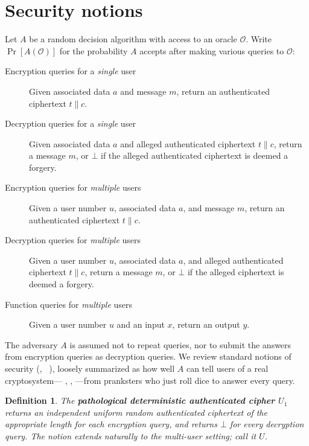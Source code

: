 \documentclass[draft]{article}
\newtheorem{definition}{Definition}
\newcommand{\term}[1]{\textbf{#1}}
\def\operatorsc#1{{%
  \ifmmode\let\next=\operatorname\else\let\next=\relax\fi\next{\textsc{#1}}}}
\def\XSalsa#1/{\operatorsc{XSalsa#1}}
\def\Daence/{\operatorsc{Daence}}
\newcommand{\concat}{\mathbin\|}
\begin{document}
\section{Security notions}

Let $A$ be a random decision algorithm with access to an oracle
 $\mathcal O$.
Write $\Pr[A(\mathcal O)]$ for the probability $A$ accepts after
 making various queries to $\mathcal O$:
%
\begin{description}
  \item[Encryption queries for a \emph{single} user]
    Given associated data $a$ and message $m$, return an authenticated
     ciphertext $t \concat c$.
  \item[Decryption queries for a \emph{single} user]
    Given associated data $a$ and alleged authenticated ciphertext
     $t \concat c$, return a message $m$, or $\bot$ if the alleged
     authenticated ciphertext is deemed a forgery.
  \item[Encryption queries for \emph{multiple} users]
    Given a user number $u$, associated data $a$, and message $m$,
     return an authenticated ciphertext $t \concat c$.
  \item[Decryption queries for \emph{multiple} users]
    Given a user number $u$, associated data $a$, and alleged
     authenticated ciphertext $t \concat c$, return a message $m$, or
     $\bot$ if the alleged ciphertext is deemed a forgery.
  \item[Function queries for \emph{multiple} users]
    Given a user number $u$ and an input $x$, return an output $y$.
\end{description}
%
The adversary $A$ is assumed not to repeat queries, nor to submit the
 answers from encryption queries as decryption queries.
We review standard notions of security
 (\eg,~%
  \cite[Definition~1]{rogaway-shrimpton2006keywrap}%
  \cite[\S3]{bellare-tackmann2016mu-ae-crypto}),
 loosely summarized as how well $A$ can tell users of a real
 cryptosystem---\Daence/, \XSalsa20/, \etc---from pranksters who just
 roll dice to answer every query.

\begin{definition}
  The \term{pathological deterministic authenticated cipher $U_1$}
   returns an independent uniform random authenticated ciphertext of
   the appropriate length for each encryption query, and returns
   $\bot$ for every decryption query.
  The notion extends naturally to the multi-user setting; call it
   $U$.
\end{definition}
\end{document}
